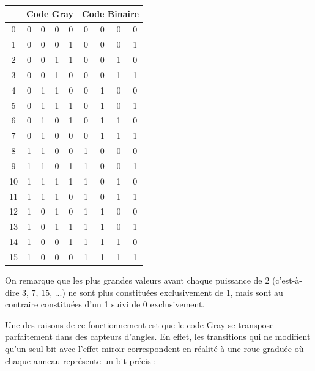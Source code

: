 \documentclass[11pt,a4paper]{article}
\begin{document}
\begin{table}[!ht]
\begin{minipage}{0.25\textwidth}
  \end{minipage}
  \hfillx
  \begin{minipage}{0.35\textwidth}
    \centering

\begin{tabular}{ | c | c c c c | c c c c |}
\hline
 & \multicolumn{4}{c|}{Code Gray} & \multicolumn{4}{c|}{Code Binaire} \\
\hline
0  & 0 & 0 & 0 & 0 &   0 & 0 & 0 & 0 \\
\hline
1  & 0 & 0 & 0 & 1 &   0 & 0 & 0 & 1 \\
\hline
2  & 0 & 0 & 1 & 1 &   0 & 0 & 1 & 0 \\
3  & 0 & 0 & 1 & 0 &   0 & 0 & 1 & 1 \\
\hline
4  & 0 & 1 & 1 & 0 &   0 & 1 & 0 & 0 \\
5  & 0 & 1 & 1 & 1 &   0 & 1 & 0 & 1 \\
6  & 0 & 1 & 0 & 1 &   0 & 1 & 1 & 0 \\
7  & 0 & 1 & 0 & 0 &   0 & 1 & 1 & 1 \\
\hline
8  & 1 & 1 & 0 & 0 &   1 & 0 & 0 & 0 \\
9  & 1 & 1 & 0 & 1 &   1 & 0 & 0 & 1 \\
10 & 1 & 1 & 1 & 1 &   1 & 0 & 1 & 0 \\
11 & 1 & 1 & 1 & 0 &   1 & 0 & 1 & 1 \\
12 & 1 & 0 & 1 & 0 &   1 & 1 & 0 & 0 \\
13 & 1 & 0 & 1 & 1 &   1 & 1 & 0 & 1 \\
14 & 1 & 0 & 0 & 1 &   1 & 1 & 1 & 0 \\
15 & 1 & 0 & 0 & 0 &   1 & 1 & 1 & 1 \\
\hline
\end{tabular}

  \end{minipage}
\end{table}

On remarque que les plus grandes valeurs avant chaque puissance de 2 (c'est-à-dire $ 3 $, $ 7 $, $ 15 $, ...) ne sont plus constituées exclusivement de 1, mais sont au contraire constituées d'un 1 suivi de 0 exclusivement.

\medskip

Une des raisons de ce fonctionnement est que le code Gray se transpose parfaitement dans des capteurs d'angles.
En effet, les transitions qui ne modifient qu'un seul bit avec l'effet miroir correspondent en réalité à une roue graduée où chaque anneau représente un bit précis :
\end{document}

